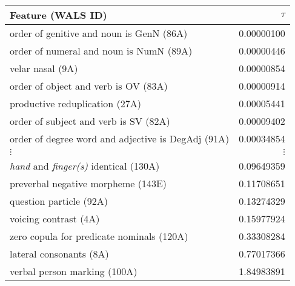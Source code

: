 \begin{tabular}{lr}
Feature (WALS ID) & $\tau$ \\
\hline
order of genitive and noun is GenN (86A)&0.00000100\\
order of numeral and noun is NumN (89A)&0.00000446\\
velar nasal (9A)&0.00000854\\
order of object and verb is OV (83A)&0.00000914\\
productive reduplication (27A)&0.00005441\\
order of subject and verb is SV (82A)&0.00009402\\
order of degree word and adjective is DegAdj (91A)&0.00034854\\
$\vdots$ & $\vdots$ \\
\emph{hand} and \emph{finger(s)} identical (130A)&0.09649359\\
preverbal negative morpheme (143E)&0.11708651\\
question particle (92A)&0.13274329\\
voicing contrast (4A)&0.15977924\\
zero copula for predicate nominals (120A)&0.33308284\\
lateral consonants (8A)&0.77017366\\
verbal person marking (100A)&1.84983891\\
\hline
\end{tabular}
